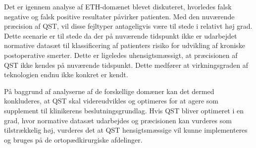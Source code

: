 Det er igennem analyse af ETH-domænet blevet diskuteret, hvorledes falsk negative og falsk positive resultater påvirker patienten. Med den nuværende præcision af QST, vil disse fejltyper antageligvis være til stede i relativt høj grad. Dette scenarie er til stede da der på nuværende tidspunkt ikke er udarbejdet normative datasæt til klassificering af patienters risiko for udvikling af kroniske postoperative smerter. Dette er ligeledes uhensigtsmæssigt, at præcisionen af QST ikke kendes på nuværende tidspunkt. Dette medfører at virkningsgraden af teknologien endnu ikke konkret er kendt.

På baggrund af analyserne af de forskellige domæner kan det dermed konkluderes, at QST skal videreudvikles og optimeres for at agere som supplement til klinikerens beslutningsgrundlag. Hvis QST bliver optimeret i en grad, hvor normative datasæt udarbejdes og præcisionen kan vurderes som tilstrækkelig høj, vurderes det at QST hensigtsmæssige vil kunne implementeres og bruges på de ortopædkirurgiske afdelinger.